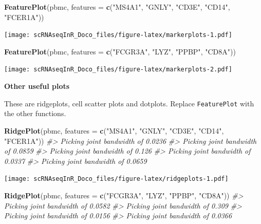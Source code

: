 \documentclass[
]{book}
\newenvironment{Shaded}{\begin{snugshade}}{\end{snugshade}}
\newcommand{\AttributeTok}[1]{\textcolor[rgb]{0.13,0.29,0.53}{#1}}
\newcommand{\CommentTok}[1]{\textcolor[rgb]{0.56,0.35,0.01}{\textit{#1}}}
\newcommand{\FunctionTok}[1]{\textcolor[rgb]{0.13,0.29,0.53}{\textbf{#1}}}
\newcommand{\NormalTok}[1]{#1}
\newcommand{\StringTok}[1]{\textcolor[rgb]{0.31,0.60,0.02}{#1}}
\begin{document}
\begin{Shaded}
\begin{Highlighting}[]
\FunctionTok{FeaturePlot}\NormalTok{(pbmc, }\AttributeTok{features =} \FunctionTok{c}\NormalTok{(}\StringTok{"MS4A1"}\NormalTok{, }\StringTok{"GNLY"}\NormalTok{, }\StringTok{"CD3E"}\NormalTok{, }\StringTok{"CD14"}\NormalTok{, }\StringTok{"FCER1A"}\NormalTok{))}
\end{Highlighting}
\end{Shaded}

\texttt{[image: scRNAseqInR\_Doco\_files/figure-latex/markerplots-1.pdf]}

\begin{Shaded}
\begin{Highlighting}[]
\FunctionTok{FeaturePlot}\NormalTok{(pbmc, }\AttributeTok{features =} \FunctionTok{c}\NormalTok{(}\StringTok{"FCGR3A"}\NormalTok{, }\StringTok{"LYZ"}\NormalTok{, }\StringTok{"PPBP"}\NormalTok{, }\StringTok{"CD8A"}\NormalTok{))}
\end{Highlighting}
\end{Shaded}

\texttt{[image: scRNAseqInR\_Doco\_files/figure-latex/markerplots-2.pdf]}

\textbf{Other useful plots}

These are ridgeplots, cell scatter plots and dotplots. Replace \texttt{FeaturePlot} with the other functions.

\begin{Shaded}
\begin{Highlighting}[]
\FunctionTok{RidgePlot}\NormalTok{(pbmc, }\AttributeTok{features =} \FunctionTok{c}\NormalTok{(}\StringTok{"MS4A1"}\NormalTok{, }\StringTok{"GNLY"}\NormalTok{, }\StringTok{"CD3E"}\NormalTok{, }\StringTok{"CD14"}\NormalTok{, }\StringTok{"FCER1A"}\NormalTok{))}
\CommentTok{\#\textgreater{} Picking joint bandwidth of 0.0236}
\CommentTok{\#\textgreater{} Picking joint bandwidth of 0.0859}
\CommentTok{\#\textgreater{} Picking joint bandwidth of 0.126}
\CommentTok{\#\textgreater{} Picking joint bandwidth of 0.0337}
\CommentTok{\#\textgreater{} Picking joint bandwidth of 0.0659}
\end{Highlighting}
\end{Shaded}

\texttt{[image: scRNAseqInR\_Doco\_files/figure-latex/ridgeplots-1.pdf]}

\begin{Shaded}
\begin{Highlighting}[]
\FunctionTok{RidgePlot}\NormalTok{(pbmc, }\AttributeTok{features =} \FunctionTok{c}\NormalTok{(}\StringTok{"FCGR3A"}\NormalTok{, }\StringTok{"LYZ"}\NormalTok{, }\StringTok{"PPBP"}\NormalTok{, }\StringTok{"CD8A"}\NormalTok{))}
\CommentTok{\#\textgreater{} Picking joint bandwidth of 0.0582}
\CommentTok{\#\textgreater{} Picking joint bandwidth of 0.309}
\CommentTok{\#\textgreater{} Picking joint bandwidth of 0.0156}
\CommentTok{\#\textgreater{} Picking joint bandwidth of 0.0366}
\end{Highlighting}
\end{Shaded}
\end{document}
